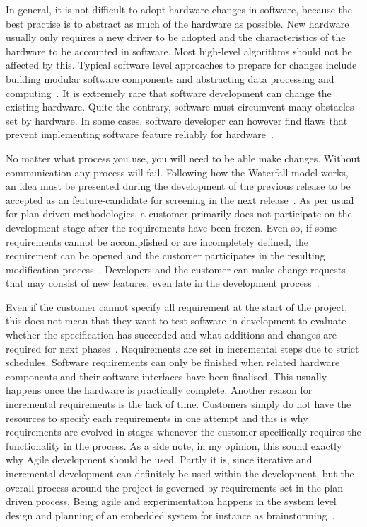 \documentclass[english]{tktltiki2}
\begin{document}
In general, it is not difficult to adopt hardware changes in software, because the best practise is to abstract as much of the hardware as possible. New hardware usually only requires a new driver to be adopted and the characteristics of the hardware to be accounted in software. Most high-level algorithms should not be affected by this. Typical software level approaches to prepare for changes include building modular software components and abstracting data processing and computing~\cite{BT15, Hol15a, Hol15b, Koi15, Kri15}. It is extremely rare that software development can change the existing hardware. Quite the contrary, software must circumvent many obstacles set by hardware. In some cases, software developer can however find flaws that prevent implementing software feature reliably for hardware~\cite{Hol15b}.

No matter what process you use, you will need to be able make changes. Without communication any process will fail. Following how the Waterfall model works, an idea must be presented during the development of the previous release to be accepted as an feature-candidate for screening in the next release~\cite{Koi15}. As per usual for plan-driven methodologies, a customer primarily does not participate on the development stage after the requirements have been frozen. Even so, if some requirements cannot be accomplished or are incompletely defined, the requirement can be opened and the customer participates in the resulting modification process~\cite{Hol15b, Koi15}. Developers and the customer can make change requests that may consist of new features, even late in the development process~\cite{Koi15}.

Even if the customer cannot specify all requirement at the start of the project, this does not mean that they want to test software in development to evaluate whether the specification has succeeded and what additions and changes are required for next phases~\cite{Hol15b}. Requirements are set in incremental steps due to strict schedules. Software requirements can only be finished when related hardware components and their software interfaces have been finalised. This usually happens once the hardware is practically complete. Another reason for incremental requirements is the lack of time. Customers simply do not have the resources to specify each requirements in one attempt and this is why requirements are evolved in stages whenever the customer specifically requires the functionality in the process. As a side note, in my opinion, this sound exactly why Agile development should be used. Partly it is, since iterative and incremental development can definitely be used within the development, but the overall process around the project is governed by requirements set in the plan-driven process. Being agile and experimentation happens in the system level design and planning of an embedded system for instance as brainstorming~\cite{Hol15b}.
\end{document}
